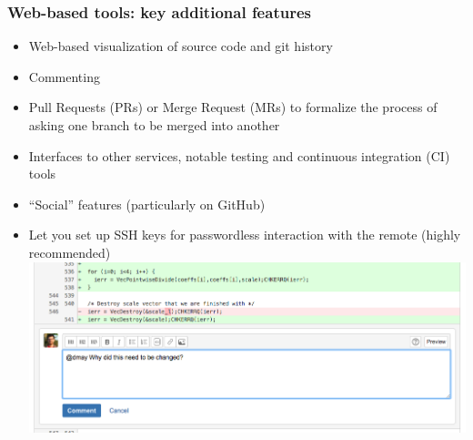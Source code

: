 \documentclass{beamer}
\begin{document}
\begin{frame}[fragile]
\frametitle{Web-based tools: key additional features}
\begin{itemize}
  \item Web-based visualization of source code and git history
  \item Commenting
  \item Pull Requests (PRs) or Merge Request (MRs) to formalize the process of asking one branch to be merged into another
  \item Interfaces to other services, notable testing and continuous integration (CI) tools
  \item ``Social'' features (particularly on GitHub)
  \item Let you set up SSH keys for passwordless interaction with the remote (highly recommended)
\includegraphics[scale=0.3]{bitbucket1}
\end{itemize}
\end{frame}
\end{document}
